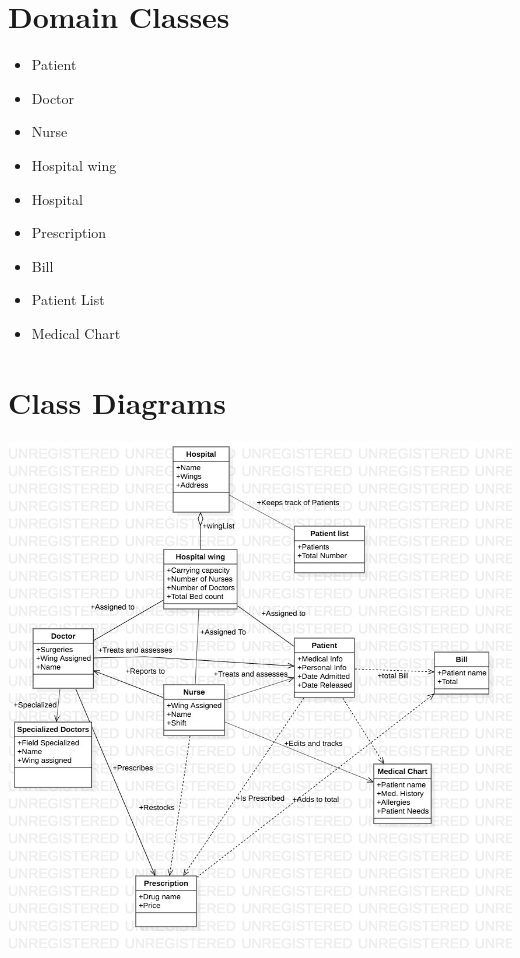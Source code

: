 \documentclass{article}
\begin{document}
\section{Domain Classes}

\begin{itemize}
\item Patient
\item Doctor
\item Nurse
\item Hospital wing
\item Hospital
\item Prescription
\item Bill
\item Patient List
\item Medical Chart

\end{itemize}

\section{Class Diagrams}

\includegraphics{OOAD Diagram}
\end{document}
